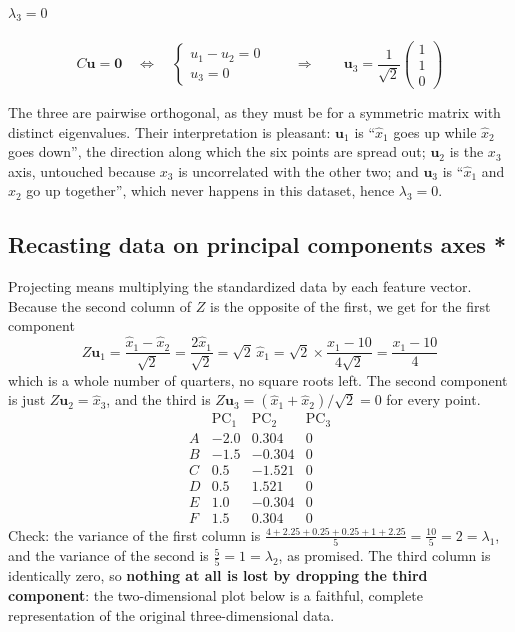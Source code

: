\documentclass[]{article}
\begin{document}
	\paragraph{$\lambda_3 = 0$}\mbox{}
	$$
	C\mathbf{u} = \mathbf{0}
	\quad\Longleftrightarrow\quad
	\begin{cases} u_1 - u_2 = 0 \\ u_3 = 0 \end{cases}
	\qquad\Longrightarrow\qquad
	\mathbf{u}_3 = \frac{1}{\sqrt{2}} \begin{pmatrix} 1 \\ 1 \\ 0 \end{pmatrix}
	$$

	The three are pairwise orthogonal, as they must be for a symmetric matrix with distinct eigenvalues.
	Their interpretation is pleasant:
	$\mathbf{u}_1$ is ``$\hat{x}_1$ goes up while $\hat{x}_2$ goes down'', the direction along which the six points are spread out;
	$\mathbf{u}_2$ is the $x_3$ axis, untouched because $x_3$ is uncorrelated with the other two;
	and $\mathbf{u}_3$ is ``$\hat{x}_1$ and $\hat{x}_2$ go up together'', which never happens in this dataset, hence $\lambda_3 = 0$.

	\subsection{Recasting data on principal components axes *}

	Projecting means multiplying the standardized data by each feature vector.
	Because the second column of $Z$ is the opposite of the first, we get for the first component
	$$
	Z \mathbf{u}_1 = \frac{\hat{x}_1 - \hat{x}_2}{\sqrt{2}} = \frac{2\hat{x}_1}{\sqrt{2}} = \sqrt{2}\,\hat{x}_1
	= \sqrt{2} \times \frac{x_1 - 10}{4\sqrt{2}} = \frac{x_1 - 10}{4}
	$$
	which is a whole number of quarters, no square roots left.
	The second component is just $Z\mathbf{u}_2 = \hat{x}_3$, and the third is $Z \mathbf{u}_3 = (\hat{x}_1 + \hat{x}_2)/\sqrt{2} = 0$ for every point.
	$$
	\begin{array}{c|rrr}
		& \text{PC}_1 & \text{PC}_2 & \text{PC}_3 \\ \hline
		A & -2.0 & 0.304 & 0 \\
		B & -1.5 & -0.304 & 0 \\
		C & 0.5 & -1.521 & 0 \\
		D & 0.5 & 1.521 & 0 \\
		E & 1.0 & -0.304 & 0 \\
		F & 1.5 & 0.304 & 0
	\end{array}
	$$
	Check: the variance of the first column is $\frac{4 + 2.25 + 0.25 + 0.25 + 1 + 2.25}{5} = \frac{10}{5} = 2 = \lambda_1$, and the variance of the second is $\frac{5}{5} = 1 = \lambda_2$, as promised.
	The third column is identically zero, so \textbf{nothing at all is lost by dropping the third component}: the two-dimensional plot below is a faithful, complete representation of the original three-dimensional data.
\end{document}
